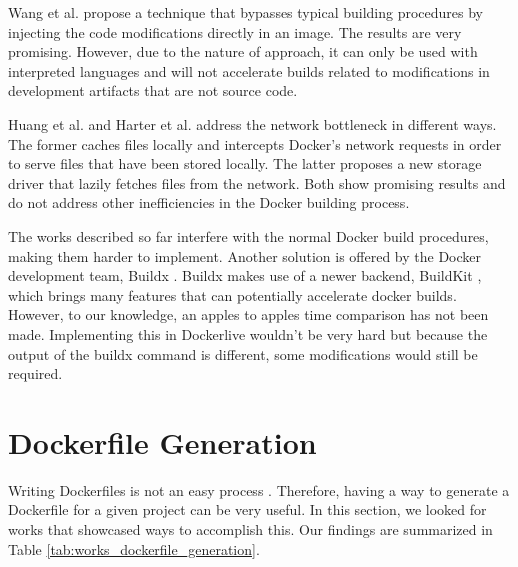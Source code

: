 Wang et al. \cite{wangCodeInjectionMethod2019} propose a technique that bypasses typical building procedures by injecting the code modifications directly in an image. The results are very promising. However, due to the nature of approach, it can only be used with interpreted languages and will not accelerate builds related to modifications in development artifacts that are not source code.

Huang et al. \cite{huangFastBuildAcceleratingDocker2019} and Harter et al. \cite{harterSlackerFastDistribution} address the network bottleneck in different ways. The former caches files locally and intercepts Docker's network requests in order to serve files that have been stored locally. The latter proposes a new storage driver that lazily fetches files from the network. Both show promising results and do not address other inefficiencies in the Docker building process.

The works described so far interfere with the normal Docker build procedures, making them harder to implement. Another solution is offered by the Docker development team, Buildx \cite{DockerBuildx2022}. Buildx makes use of a newer backend, BuildKit \cite{BuildKit2022}, which brings many features that can potentially accelerate docker builds. However, to our knowledge, an apples to apples time comparison has not been made. Implementing this in Dockerlive wouldn't be very hard but because the output of the buildx command is different, some modifications would still be required.

\section{Dockerfile Generation} \label{sec:dockerfile_generation}

Writing Dockerfiles is not an easy process \cite{reisDevelopingDockerDockerCompose2022}. Therefore, having a way to generate a Dockerfile for a given project can be very useful. In this section, we looked for works that showcased ways to accomplish this. Our findings are summarized in Table \ref{tab:works_dockerfile_generation}.

